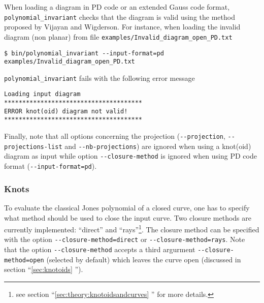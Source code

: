 When loading a diagram in PD code or an extended Gauss code format, \lstinline{polynomial_invariant} checks that the diagram is valid using the method proposed by Vijayan and Wigderson\cite{Vijayan1982}. For instance, when loading the invalid diagram (non planar) from file \lstinline{examples/Invalid_diagram_open_PD.txt}
\begin{lstlisting}
$ bin/polynomial_invariant --input-format=pd examples/Invalid_diagram_open_PD.txt
\end{lstlisting}
\lstinline{polynomial_invariant} fails with the following error message
\begin{lstlisting}
Loading input diagram
**************************************
ERROR knot(oid) diagram not valid!
**************************************
\end{lstlisting}

Finally, note that all options concerning the projection (\lstinline{--projection}, \lstinline{--projections-list} and \lstinline{--nb-projections}) are ignored when using a knot(oid) diagram as input while option \lstinline{--closure-method} is ignored when using PD code format (\lstinline{--input-format=pd}).

\subsubsection{Knots}
To evaluate the classical Jones polynomial of a closed curve, one has to specify what method should be used to close the input curve. Two closure methods are currently implemented: ``direct'' and ``rays''\footnote{see section ``\ref{sec:theory:knotoidsandcurves} '' for more details.}. The closure method can be specified with the option \lstinline{--closure-method=direct} or \lstinline{--closure-method=rays}. Note that the option \lstinline{--closure-method} accepts a third argurment \lstinline{--closure-method=open} (selected by default) which leaves the curve open (discussed in section ``\ref{sec:knotoids} '').

